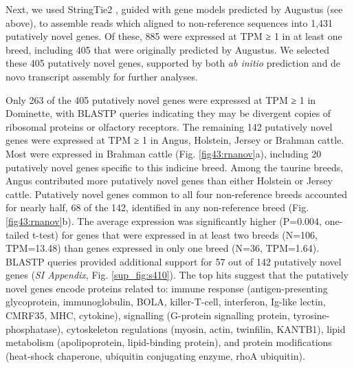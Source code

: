\documentclass[../main.tex]{subfiles}
\begin{document}
Next, we used StringTie2 \citep{kovaka2019transcriptome}, guided with gene models predicted by Augustus (see above), to assemble reads which aligned to non-reference sequences into 1,431 putatively novel genes. Of these, 885 were expressed at TPM ≥ 1 in at least one breed, including 405 that were originally predicted by Augustus. We selected these 405 putatively novel genes, supported by both \emph{ab initio }prediction and de novo transcript assembly for further analyses. 

Only 263 of the 405 putatively novel genes were expressed at TPM ≥ 1 in Dominette, with BLASTP queries indicating they may be divergent copies of ribosomal proteins or olfactory receptors. The remaining 142 putatively novel genes were expressed at TPM ≥ 1 in Angus, Holstein, Jersey or Brahman cattle. Most were expressed in Brahman cattle (Fig. \ref{fig43:rnanov}a), including 20 putatively novel genes specific to this indicine breed. Among the taurine breeds, Angus contributed more putatively novel genes than either Holstein or Jersey cattle. Putatively novel genes common to all four non-reference breeds accounted for nearly half, 68 of the 142, identified in any non-reference breed (Fig. \ref{fig43:rnanov}b). The average expression was significantly higher (P=0.004, one-tailed t-test) for genes that were expressed in at least two breeds (N=106, TPM=13.48) than genes expressed in only one breed (N=36, TPM=1.64). BLASTP queries provided additional support for 57 out of 142 putatively novel genes (\emph{SI Appendix}, Fig. \ref{sup_fig:s410}). The top hits suggest that the putatively novel genes encode proteins related to: immune response (antigen-presenting glycoprotein, immunoglobulin, BOLA, killer-T-cell, interferon, Ig-like lectin, CMRF35, MHC, cytokine), signalling (G-protein signalling protein, tyrosine-phosphatase), cytoskeleton regulations (myosin, actin, twinfilin, KANTB1), lipid metabolism (apolipoprotein, lipid-binding protein), and protein modifications (heat-shock chaperone, ubiquitin conjugating enzyme, rhoA ubiquitin). 
\end{document}
